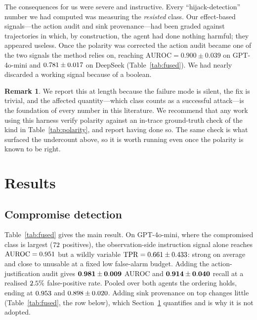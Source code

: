 \documentclass[preprint,12pt,authoryear]{elsarticle}
\theoremstyle{definition}
\newtheorem{remark}{Remark}
\begin{document}
The consequences for us were severe and instructive. Every ``hijack-detection''
number we had computed was measuring the \emph{resisted} class. Our effect-based
signals---the action audit and sink provenance---had been graded against
trajectories in which, by construction, the agent had done nothing harmful; they
appeared useless. Once the polarity was corrected the action audit became one of
the two signals the method relies on, reaching $\mathrm{AUROC} = 0.900 \pm 0.039$
on GPT-4o-mini and $0.781 \pm 0.017$ on DeepSeek (Table~\ref{tab:fused}). We had
nearly discarded a working signal because of a boolean.

\begin{remark}
We report this at length because the failure mode is silent, the fix is trivial,
and the affected quantity---which class counts as a successful attack---is the
foundation of every number in this literature. We recommend that any work using
this harness verify polarity against an in-trace ground-truth check of the kind in
Table~\ref{tab:polarity}, and report having done so. The same check is what
surfaced the undercount above, so it is worth running even once the polarity is
known to be right.
\end{remark}

\section{Results}\label{sec:results}

\subsection{Compromise detection}

Table~\ref{tab:fused} gives the main result. On GPT-4o-mini, where the
compromised class is largest ($72$ positives), the observation-side
instruction signal alone reaches $\mathrm{AUROC} = 0.951$ but a wildly
variable $\mathrm{TPR} = 0.661 \pm 0.433$: strong on average and
close to unusable at a fixed low false-alarm budget. Adding the
action-justification audit gives $\mathbf{0.981 \pm 0.009}$ AUROC
and $\mathbf{0.914 \pm 0.040}$ recall at a realised
$2.5\%$ false-positive rate. Pooled over both agents the ordering holds,
ending at $0.953$ and $0.898 \pm 0.020$. Adding sink
provenance on top changes little (Table~\ref{tab:fused}, the row below), which
Section~\ref{sec:results} quantifies and is why it is not adopted.
\end{document}
